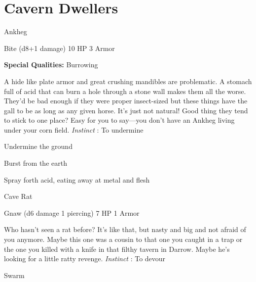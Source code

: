 \chapter{Cavern Dwellers}
   
 


\startMonsterName
Ankheg	 
\stopMonsterName
 

Bite (d8+1 damage)	10 HP	3 Armor

 


 
\startMonsterQualities
{\bf Special Qualities:}  Burrowing
\stopMonsterQualities
 
\startMonsterDescription
A hide like plate armor and great crushing mandibles are problematic. A stomach full of acid that can burn a hole through a stone wall makes them all the worse. They’d be bad enough if they were proper insect-sized but these things have the gall to be as long as any given horse. It’s just not natural! Good thing they tend to stick to one place? Easy for you to say—you don’t have an Ankheg living under your corn field. {\em Instinct} : To undermine
\stopMonsterDescription
 
\startitemize[1,packed]

\item Undermine the ground

 
\item Burst from the earth

 
\item Spray forth acid, eating away at metal and flesh


\stopitemize
 
\startMonsterName
Cave Rat	 
\stopMonsterName
 

Gnaw (d6 damage 1 piercing)	7 HP	1 Armor

 


 
\startMonsterDescription
Who hasn’t seen a rat before? It’s like that, but nasty and big and not afraid of you anymore. Maybe this one was a cousin to that one you caught in a trap or the one you killed with a knife in that filthy tavern in Darrow. Maybe he’s looking for a little ratty revenge. {\em Instinct} : To devour
\stopMonsterDescription
 
\startitemize[1,packed]

\item Swarm

